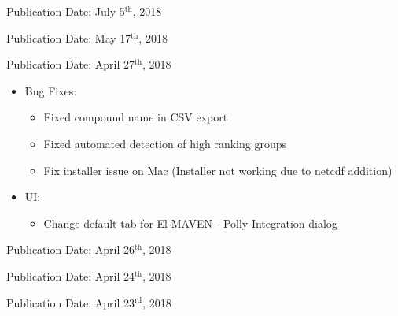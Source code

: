 \documentclass[letterpaper,10pt,english,openany,oneside]{sphinxmanual}
\begin{document}

Publication Date: July 5$^{\text{th}}$, 2018


Publication Date: May 17$^{\text{th}}$, 2018


Publication Date: April 27$^{\text{th}}$, 2018
\begin{itemize}
\item {} 
Bug Fixes:
\begin{itemize}
\item {} 
Fixed compound name in CSV export 

\item {} 
Fixed automated detection of high ranking groups

\item {} 
Fix installer issue on Mac (Installer not working due to netcdf addition)

\end{itemize}

\item {} 
UI:
\begin{itemize}
\item {} 
Change default tab for El-MAVEN - Polly Integration dialog

\end{itemize}

\end{itemize}


Publication Date: April 26$^{\text{th}}$, 2018


Publication Date: April 24$^{\text{th}}$, 2018


Publication Date: April 23$^{\text{rd}}$, 2018

\end{document}

